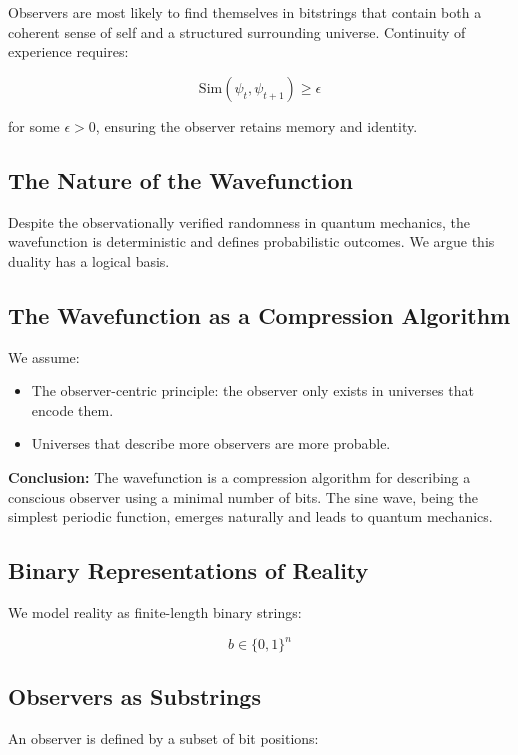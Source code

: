 \documentclass[11pt]{article}
\begin{document}
Observers are most likely to find themselves in bitstrings that contain both a coherent sense of self and a structured surrounding universe. Continuity of experience requires:

\[
      \mathrm{Sim}(\psi_t, \psi_{t+1}) \geq \epsilon
\]

for some \(\epsilon > 0\), ensuring the observer retains memory and identity.

\subsection{The Nature of the Wavefunction}

Despite the observationally verified randomness in quantum mechanics, the wavefunction is deterministic and defines probabilistic outcomes. We argue this duality has a logical basis.

\subsection{The Wavefunction as a Compression Algorithm}

We assume:

\begin{itemize}
      \item The observer-centric principle: the observer only exists in universes that encode them.
      \item Universes that describe more observers are more probable.
\end{itemize}

\textbf{Conclusion:} The wavefunction is a compression algorithm for describing a conscious observer using a minimal number of bits. The sine wave, being the simplest periodic function, emerges naturally and leads to quantum mechanics.

\subsection{Binary Representations of Reality}

We model reality as finite-length binary strings:

\[
      b \in \{0,1\}^n
\]

\subsection{Observers as Substrings}

An observer is defined by a subset of bit positions:
\end{document}
